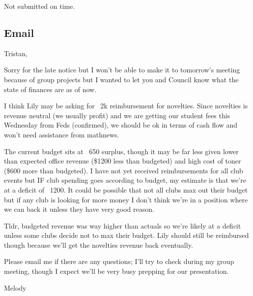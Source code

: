 Not submitted on time.


\subsection*{Email}
Tristan,

Sorry for the late notice but I won't be able to make it to tomorrow's meeting because of group projects but I wanted to let you and Council know what the state of finances are as of now.

I think Lily may be asking for ~2k reimbursement for novelties. Since novelties is revenue neutral (we usually profit) and we are getting our student fees this Wednesday from Feds (confirmed), we should be ok in terms of cash flow and won't need assistance from mathnews.

The current budget sits at ~650 surplus, though it may be far less given lower than expected office revenue (\$1200 less than budgeted) and high cost of toner (\$600 more than budgeted). I have not yet received reimbursements for all club events but IF club spending goes according to budget, my estimate is that we're at a deficit of ~1200. It could be possible that not all clubs max out their budget but if any club is looking for more money I don't think we're in a position where we can back it unless they have very good reason.

Tldr, budgeted revenue was way higher than actuals so we're likely at a deficit unless some clubs decide not to max their budget. Lily should still be reimbursed though because we'll get the novelties revenue back eventually.

Please email me if there are any questions; I'll try to check during my group meeting, though I expect we'll be very busy prepping for our presentation.

Melody